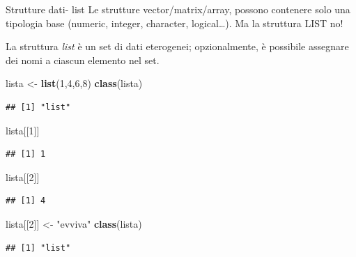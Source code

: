 \documentclass[
  ignorenonframetext,
]{beamer}
\newenvironment{Shaded}{\begin{snugshade}}{\end{snugshade}}
\newcommand{\DecValTok}[1]{\textcolor[rgb]{0.00,0.00,0.81}{#1}}
\newcommand{\FunctionTok}[1]{\textcolor[rgb]{0.13,0.29,0.53}{\textbf{#1}}}
\newcommand{\NormalTok}[1]{#1}
\newcommand{\OtherTok}[1]{\textcolor[rgb]{0.56,0.35,0.01}{#1}}
\newcommand{\StringTok}[1]{\textcolor[rgb]{0.31,0.60,0.02}{#1}}
\begin{document}
\begin{frame}[fragile]{Strutture dati- list}
\protect\hypertarget{strutture-dati--list}{}
Le strutture vector/matrix/array, possono contenere solo una tipologia
base (numeric, integer, character, logical\ldots). Ma la struttura LIST
no!

La struttura \emph{list} è un set di dati eterogenei; opzionalmente, è
possibile assegnare dei nomi a ciascun elemento nel set.

\begin{Shaded}
\begin{Highlighting}[]
\NormalTok{lista }\OtherTok{\textless{}{-}} \FunctionTok{list}\NormalTok{(}\DecValTok{1}\NormalTok{,}\DecValTok{4}\NormalTok{,}\DecValTok{6}\NormalTok{,}\DecValTok{8}\NormalTok{)}
\FunctionTok{class}\NormalTok{(lista)}
\end{Highlighting}
\end{Shaded}

\begin{verbatim}
## [1] "list"
\end{verbatim}

\begin{Shaded}
\begin{Highlighting}[]
\NormalTok{lista[[}\DecValTok{1}\NormalTok{]]}
\end{Highlighting}
\end{Shaded}

\begin{verbatim}
## [1] 1
\end{verbatim}

\begin{Shaded}
\begin{Highlighting}[]
\NormalTok{lista[[}\DecValTok{2}\NormalTok{]]}
\end{Highlighting}
\end{Shaded}

\begin{verbatim}
## [1] 4
\end{verbatim}

\begin{Shaded}
\begin{Highlighting}[]
\NormalTok{lista[[}\DecValTok{2}\NormalTok{]] }\OtherTok{\textless{}{-}} \StringTok{"evviva"}
\FunctionTok{class}\NormalTok{(lista)}
\end{Highlighting}
\end{Shaded}

\begin{verbatim}
## [1] "list"
\end{verbatim}


\end{frame}
\end{document}
